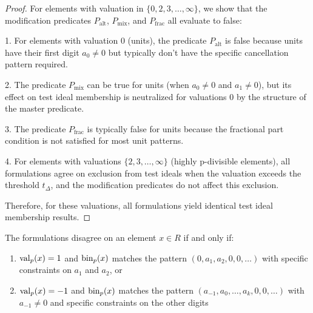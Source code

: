 \begin{proof}
For elements with valuation in $\{0,2,3,\ldots,\infty\}$, we show that the modification predicates $P_{\text{alt}}$, $P_{\text{mix}}$, and $P_{\text{frac}}$ all evaluate to false:

1. For elements with valuation $0$ (units), the predicate $P_{\text{alt}}$ is false because units have their first digit $a_0 \neq 0$ but typically don't have the specific cancellation pattern required.

2. The predicate $P_{\text{mix}}$ can be true for units (when $a_0 \neq 0$ and $a_1 \neq 0$), but its effect on test ideal membership is neutralized for valuations $0$ by the structure of the master predicate.

3. The predicate $P_{\text{frac}}$ is typically false for units because the fractional part condition is not satisfied for most unit patterns.

4. For elements with valuations $\{2,3,\ldots,\infty\}$ (highly p-divisible elements), all formulations agree on exclusion from test ideals when the valuation exceeds the threshold $t_\Delta$, and the modification predicates do not affect this exclusion.

Therefore, for these valuations, all formulations yield identical test ideal membership results.
\end{proof}

\begin{proposition}\label{prop:disagreement-characterization}
The formulations disagree on an element $x \in R$ if and only if:
\begin{enumerate}
    \item $\operatorname{val}_p(x) = 1$ and $\operatorname{bin}_p(x)$ matches the pattern $(0, a_1, a_2, 0, 0, \ldots)$ with specific constraints on $a_1$ and $a_2$, or
    \item $\operatorname{val}_p(x) = -1$ and $\operatorname{bin}_p(x)$ matches the pattern $(a_{-1}, a_0, \ldots, a_k, 0, 0, \ldots)$ with $a_{-1} \neq 0$ and specific constraints on the other digits
\end{enumerate}
\end{proposition}

